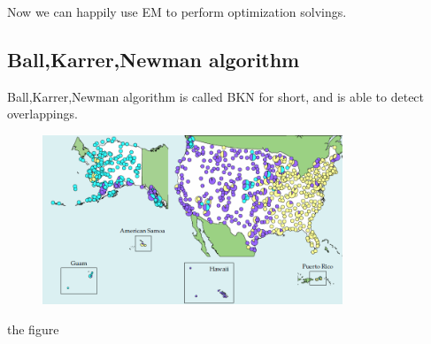 \documentclass[UTF8, 11pt, a4paper]{ctexart}
\begin{document}
Now we can happily use EM to perform optimization solvings.

\subsection{Ball,Karrer,Newman algorithm}
Ball,Karrer,Newman algorithm is called BKN for short, and is able to detect overlappings.
\begin{figure}[H]
	\centering
	\includegraphics[width=0.80\textwidth]{bkn}
	\caption{}
\end{figure}
the figure
\end{document}

